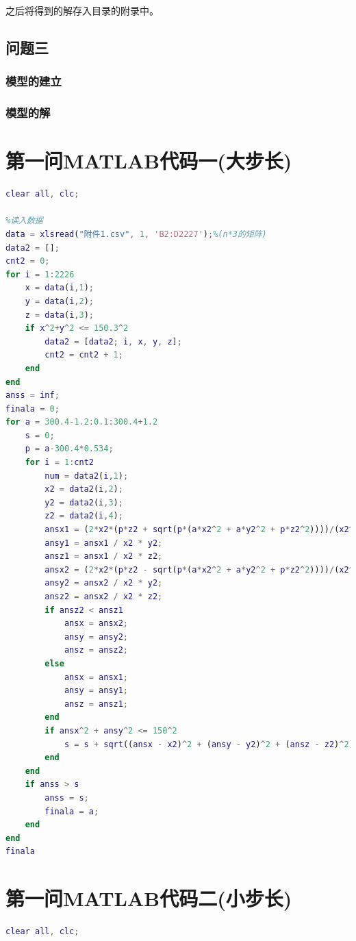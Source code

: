 \documentclass[withoutpreface,bwprint]{cumcmthesis} %
\begin{document}
之后将得到的解存入目录的附录中。
\subsection{问题三}
\subsubsection{模型的建立}
\subsubsection{模型的解}
\nocite{宋叶志2019}

\begin{appendices}
\section{第一问MATLAB代码一(大步长)}
\begin{lstlisting}[language=matlab]
clear all, clc;

%读入数据
data = xlsread("附件1.csv", 1, 'B2:D2227');%(n*3的矩阵)
data2 = [];
cnt2 = 0;
for i = 1:2226
    x = data(i,1);
    y = data(i,2);
    z = data(i,3);
    if x^2+y^2 <= 150.3^2
        data2 = [data2; i, x, y, z];
        cnt2 = cnt2 + 1;
    end
end
anss = inf;
finala = 0;
for a = 300.4-1.2:0.1:300.4+1.2
    s = 0;
    p = a-300.4*0.534;
    for i = 1:cnt2
        num = data2(i,1);
        x2 = data2(i,2);
        y2 = data2(i,3);
        z2 = data2(i,4);
        ansx1 = (2*x2*(p*z2 + sqrt(p*(a*x2^2 + a*y2^2 + p*z2^2))))/(x2^2 + y2^2); 
        ansy1 = ansx1 / x2 * y2;
        ansz1 = ansx1 / x2 * z2;
        ansx2 = (2*x2*(p*z2 - sqrt(p*(a*x2^2 + a*y2^2 + p*z2^2))))/(x2^2 + y2^2);
        ansy2 = ansx2 / x2 * y2;
        ansz2 = ansx2 / x2 * z2;
        if ansz2 < ansz1
            ansx = ansx2;
            ansy = ansy2;
            ansz = ansz2;
        else
            ansx = ansx1;
            ansy = ansy1;
            ansz = ansz1;
        end
        if ansx^2 + ansy^2 <= 150^2
            s = s + sqrt((ansx - x2)^2 + (ansy - y2)^2 + (ansz - z2)^2);
        end
    end
    if anss > s
        anss = s;
        finala = a;
    end
end
finala

\end{lstlisting}
\section{第一问MATLAB代码二(小步长)}
\begin{lstlisting}[language=matlab]
clear all, clc;


\end{lstlisting}
\end{appendices}
\end{document}
